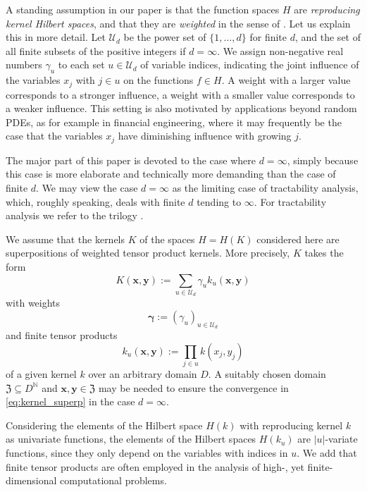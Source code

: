 \documentclass{article}
\newcommand{\N}  {{\mathbb N}}
\newcommand{\bx}{{\mathbf x}}
\newcommand{\by}{{\mathbf y}}
\newcommand{\bg}{{\boldsymbol{\gamma}}}
\newcommand{\Z}{{\mathfrak Z}}
\newcommand{\U}  {\mathcal{U}}
\theoremstyle{plain}
\theoremstyle{definition}
\begin{document}
A standing assumption in our paper is that the function spaces $H$
are \emph{reproducing kernel Hilbert spaces}, and that they are 
\emph{weighted} in the sense of \citet{SW98}.
Let us explain this in more detail. Let $\U_d$ be the power set of 
$\{1,\ldots,d\}$ for finite $d$, and the set of all finite subsets 
of the positive integers if $d=\infty$. We assign non-negative real 
numbers $\gamma_u$ to each set $u\in \U_d$
of variable indices, indicating the 
joint influence of the variables $x_j$ with $j \in u$
on the functions $f \in H$.
A weight with a larger value corresponds to 
a stronger influence,
a weight with a smaller value corresponds to 
a weaker influence.
This setting is also motivated by applications 
beyond random PDEs, as for example in financial 
engineering, where it may frequently be the case that the variables 
$x_j$ have diminishing influence with growing $j$.


The major part of this paper is devoted to the case where $d=\infty$,
simply because this case is more elaborate and technically more 
demanding than the case of finite $d$. We may view the case 
$d=\infty$ as the limiting case of tractability analysis, which,
roughly speaking, deals with finite $d$ tending to $\infty$.
For tractability analysis we refer to the trilogy 
\citet{NW08,NW10,NW12}.

We assume that the kernels $K$ of the spaces 
$H = H(K)$ considered here 
are superpositions of weighted tensor product kernels.
More precisely, $K$ takes the form 
\begin{equation}\label{eq:kernel_superp}
   K (\bx, \by) := \sum_{u \in \U_d} \gamma_u k_u(\bx, \by)
\end{equation}
with weights
\[
\bg := (\gamma_u)_{u \in \U_d}
\]
and finite tensor products
\[
k_u (\bx,\by) := \prod_{j \in u} k(x_j,y_j)
\]
of a given kernel $k$ over an arbitrary domain $D$. 
A suitably chosen domain $\Z \subseteq D^\N$
and $\bx,\by \in \Z$
may be needed to ensure the convergence in
\eqref{eq:kernel_superp} in the case $d = \infty$.

Considering the elements of the Hilbert space $H(k)$ with 
reproducing kernel $k$ as univariate functions, 
the elements of the Hilbert spaces $H(k_u)$ are 
$|u|$-variate functions, since they only depend 
on the variables with indices in $u$. 
We add that finite tensor products are often employed
in the analysis of high-, yet finite-dimensional computational
problems.
\end{document}
